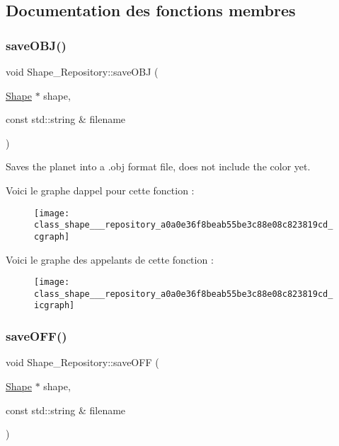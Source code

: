 \subsection{Documentation des fonctions membres}
\mbox{\label{class_shape___repository_a0a0e36f8beab55be3c88e08c823819cd}} 
\subsubsection{\texorpdfstring{save\+O\+B\+J()}{saveOBJ()}}
{\footnotesize\ttfamily void Shape\+\_\+\+Repository\+::save\+O\+BJ (\begin{DoxyParamCaption}\item[{\hyperlink{class_shape}{Shape} $\ast$}]{shape,  }\item[{const std\+::string \&}]{filename }\end{DoxyParamCaption})\hspace{0.3cm}{\ttfamily [static]}}



Saves the planet into a .obj format file, does not include the color yet. 

Voici le graphe d\textquotesingle{}appel pour cette fonction \+:\nopagebreak
\begin{figure}[H]
\begin{center}
\leavevmode
\texttt{[image: class\_shape\_\_\_repository\_a0a0e36f8beab55be3c88e08c823819cd\_cgraph]}
\end{center}
\end{figure}
Voici le graphe des appelants de cette fonction \+:\nopagebreak
\begin{figure}[H]
\begin{center}
\leavevmode
\texttt{[image: class\_shape\_\_\_repository\_a0a0e36f8beab55be3c88e08c823819cd\_icgraph]}
\end{center}
\end{figure}
\mbox{\label{class_shape___repository_ad52141b6883d20084a0105355f2271b5}} 
\subsubsection{\texorpdfstring{save\+O\+F\+F()}{saveOFF()}}
{\footnotesize\ttfamily void Shape\+\_\+\+Repository\+::save\+O\+FF (\begin{DoxyParamCaption}\item[{\hyperlink{class_shape}{Shape} $\ast$}]{shape,  }\item[{const std\+::string \&}]{filename }\end{DoxyParamCaption})\hspace{0.3cm}{\ttfamily [static]}}



